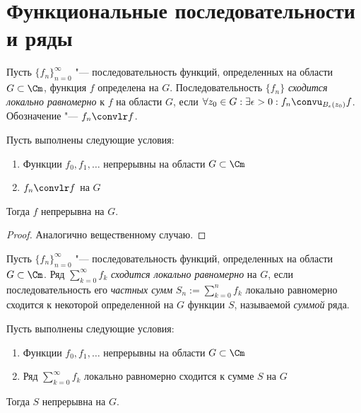 \section{Функциональные последовательности и ряды}

\begin{definition}
	Пусть $\{f_n\}_{n = 0}^\infty$ "--- последовательность функций, определенных на области $G \subset \Cm$, функция $f$ определена на $G$. Последовательность $\{f_n\}$ \textit{сходится локально равномерно} к $f$ на области $G$, если $\forall z_0 \in G: \exists \epsilon > 0: f_n \convu_{B_\epsilon(z_0)} f$. Обозначение "--- $f_n \convlr f$.
\end{definition}

\begin{proposition}
	Пусть выполнены следующие условия:
	\begin{enumerate}
		\item Функции $f_0, f_1, \dotsc$ непрерывны на области $G \subset \Cm$
		\item $f_n \convlr f$ на $G$
	\end{enumerate}
	
	Тогда $f$ непрерывна на $G$.
\end{proposition}

\begin{proof}
	Аналогично вещественному случаю.
\end{proof}

\begin{definition}
	Пусть $\{f_n\}_{n = 0}^\infty$ "--- последовательность функций, определенных на области $G \subset \Cm$. Ряд $\sum_{k = 0}^\infty f_k$ \textit{сходится локально равномерно} на $G$, если последовательность его \textit{частных сумм} $S_n := \sum_{k = 0}^nf_k$ локально равномерно сходится к некоторой определенной на $G$ функции $S$, называемой \textit{суммой} ряда.
\end{definition}

\begin{proposition}
	Пусть выполнены следующие условия:
	\begin{enumerate}
		\item Функции $f_0, f_1, \dotsc$ непрерывны на области $G \subset \Cm$
		\item Ряд $\sum_{k = 0}^\infty f_k$ локально равномерно сходится к сумме $S$ на $G$
	\end{enumerate}
	
	Тогда $S$ непрерывна на $G$.
\end{proposition}

